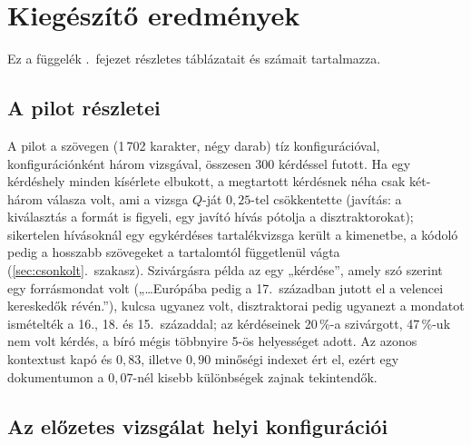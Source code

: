 
\chapter{Kiegészítő eredmények}
\label{app-eredmeny-reszletek}

Ez a függelék \az{\ref{ch:eredmenyek}}.~fejezet részletes táblázatait és számait tartalmazza.

\section{A pilot részletei}
\label{app-er-pilot}

A pilot a  szövegen (1\,702 karakter, négy darab) tíz konfigurációval, konfigurációnként három
vizsgával, összesen 300 kérdéssel futott. Ha egy kérdéshely minden kísérlete elbukott, a megtartott kérdésnek
néha csak két-három válasza volt, ami a vizsga $Q$-ját $0{,}25$-tel csökkentette (javítás: a kiválasztás a formát
is figyeli, egy javító hívás pótolja a disztraktorokat); sikertelen hívásoknál egy egykérdéses tartalékvizsga
került a kimenetbe, a kódoló pedig a hosszabb szövegeket a tartalomtól függetlenül vágta
(\ref{sec:csonkolt}.~szakasz). Szivárgásra példa az  egy „kérdése”, amely szó szerint egy forrásmondat
volt („…Európába pedig a 17.~században jutott el a velencei kereskedők révén.”), kulcsa ugyanez volt, disztraktorai pedig ugyanezt a mondatot ismételték a
16., 18. és 15.~századdal; az  kérdéseinek 20\,\%-a szivárgott, 47\,\%-uk nem volt kérdés, a bíró mégis
többnyire 5-ös helyességet adott. Az azonos kontextust kapó  és  $0{,}83$, illetve $0{,}90$
minőségi indexet ért el, ezért egy dokumentumon a $0{,}07$-nél kisebb különbségek zajnak tekintendők.

\section{Az előzetes vizsgálat helyi konfigurációi}
\label{app-er-elozetes}

